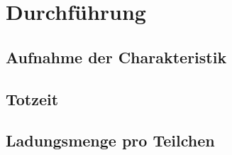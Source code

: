 \section{Durchführung}
\label{sec:Durchfuehrung}
\subsection{Aufnahme der Charakteristik}
\subsection{Totzeit}
\subsection{Ladungsmenge pro Teilchen}